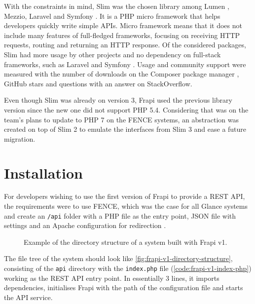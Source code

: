 With the constraints in mind, Slim \cite{slim-website} was the chosen library among Lumen \cite{lumen-website}, Mezzio\cite{mezzio-website}, Laravel\cite{laravel-website} and Symfony \cite{symfony-website}. It is a PHP micro framework that helps developers quickly write simple APIs. Micro framework means that it does not include many features of full-fledged frameworks, focusing on receiving HTTP requests, routing and returning an HTTP response. Of the considered packages, Slim \cite{slim-website} had more usage by other projects and no dependency on full-stack frameworks, such as Laravel \cite{laravel-website} and Symfony \cite{symfony-website}. Usage and community support were measured with the number of downloads on the Composer package manager \cite{composer-website}, GitHub stars and questions with an answer on StackOverflow.

Even though Slim was already on version 3, Frapi used the previous library version since the new one did not support PHP 5.4. Considering that was on the team's plans to update to PHP 7 on the FENCE systems, an abstraction was created on top of Slim 2 \cite{slim-2-doc} to emulate the interfaces from Slim 3 and ease a future migration.

\section{Installation}
\label{sec:frapi-v1-installation}

For developers wishing to use the first version of Frapi to provide a REST API, the requirements were to use FENCE, which was the case for all Glance systems and create an \texttt{/api} folder with a PHP file as the entry point, JSON file with settings and an Apache configuration for redirection \cite{frapi-v1-setup-documentation}.

\begin{figure}
\centering
\begin{minipage}{0.9\textwidth}
\end{minipage}
\caption{Example of the directory structure of a system built with Frapi v1.}
\label{fig:frapi-v1-directory-structure}
\end{figure}

The file tree of the system should look like \autoref{fig:frapi-v1-directory-structure}, consisting of the \texttt{api} directory with the \texttt{index.php} file (\autoref{code:frapi-v1-index-php}) working as the REST API entry point. In essentially 3 lines, it imports dependencies, initialises Frapi with the path of the configuration file and starts the API service.

